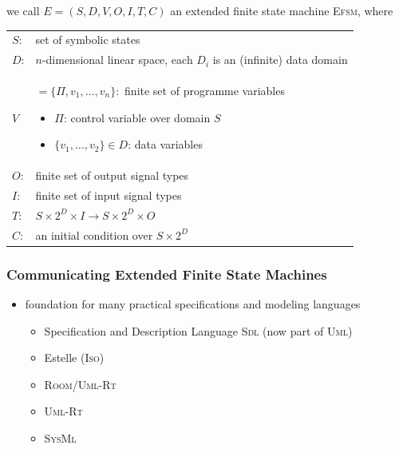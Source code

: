 \documentclass[a4paper, 10pt]{article}
\begin{document}
\begin{shaded}
    we call $E=(S,D,V,O,I,T,C)$ an extended finite state machine \textsc{Efsm}, where
    \begin{tabular}{ll}
    $S$: & set of symbolic states \\
    $D$: & $n$-dimensional linear space, each $D_i$ is an (infinite) data domain \\
    $V$ &
    \begin{minipage}[t]{10cm}
    $=\{\Pi,v_1,\dots,v_n\}:$ finite set of programme variables
    \begin{itemize}
        \item $\Pi$: control variable over domain $S$
        \item $\{v_1,\dots,v_2\}\in D$: data variables
    \end{itemize}
    \end{minipage} \\
    $O$: & finite set of output signal types \\
    $I$: & finite set of input signal types \\
    $T$: & $S\times 2^D\times I \to S\times 2^D\times O$ \\
    $C$: & an initial condition over $S\times 2^D$
    \end{tabular}
\end{shaded}

\subsubsection*{Communicating Extended Finite State Machines}
\begin{itemize}
    \item foundation for many practical specifications and modeling languages
    \begin{itemize}
        \item Specification and Description Language \textsc{Sdl} (now part of \textsc{Uml})
        \item Estelle (\textsc{Iso})
        \item \textsc{Room/Uml-Rt}
        \item \textsc{Uml-Rt}
        \item \textsc{SysMl}
    \end{itemize}
\end{itemize}
\end{document}
